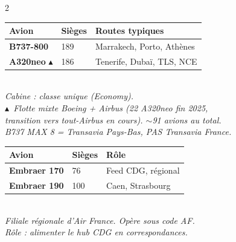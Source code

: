 \documentclass[9pt,a4paper,landscape]{article}
\newcommand{\sectionbanner}[2]{%
\noindent\colorbox{#1}{\parbox{\dimexpr\textwidth-2\fboxsep}{%
\vspace{3pt}\hspace{6pt}{\Large\bfseries\color{white}#2}\vspace{3pt}}}%
\vspace{4pt}%
}
\newcommand{\CORR}{\textcolor{afred}{$\blacktriangle$}}
\begin{document}
\begin{multicols}{2}
\vspace{0.15cm}

\begin{tcolorbox}[colback=amerlight,colframe=ameror,title={\textbf{TRANSAVIA FRANCE (TO) \CORR}},fonttitle=\bfseries\color{white}]
\begin{tabular}{lll}
\toprule
\textbf{Avion} & \textbf{Sièges} & \textbf{Routes typiques} \\
\midrule
\textbf{B737-800} & 189 & Marrakech, Porto, Athènes \\
\textbf{A320neo} \CORR & 186 & Tenerife, Dubaï, TLS, NCE \\
\bottomrule
\end{tabular}\\[0.1cm]
\textit{Cabine : classe unique (Economy).}\\
\textit{\CORR\ Flotte mixte Boeing + Airbus (22 A320neo fin 2025,}\\
\textit{transition vers tout-Airbus en cours). $\sim$91 avions au total.}\\
\textit{B737 MAX 8 = Transavia Pays-Bas, PAS Transavia France.}
\end{tcolorbox}

\begin{tcolorbox}[colback=aflight,colframe=afblue,title={\textbf{AIR FRANCE HOP}},fonttitle=\bfseries\color{white}]
\begin{tabular}{lll}
\toprule
\textbf{Avion} & \textbf{Sièges} & \textbf{Rôle} \\
\midrule
\textbf{Embraer 170} & 76 & Feed CDG, régional \\
\textbf{Embraer 190} & 100 & Caen, Strasbourg \\
\bottomrule
\end{tabular}\\[0.1cm]
\textit{Filiale régionale d'Air France. Opère sous code AF.}\\
\textit{Rôle : alimenter le hub CDG en correspondances.}
\end{tcolorbox}

\end{multicols}

\sectionbanner{afblue}{HUBS PARIS --- CDG \& ORLY}
\end{document}
